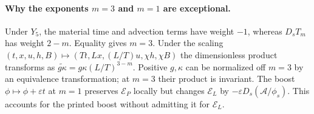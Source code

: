 \documentclass[12pt,a4paper,oneside]{report}
\numberwithin{equation}{chapter}
\theoremstyle{definition}
\theoremstyle{remark}\newtheorem{remark}[theorem]{Remark}
\newif\ifreviewmarks
\DeclareRobustCommand{\review}[1]{{\ifreviewmarks\color{authorblue}\fi #1}}
\begin{document}
\paragraph{Why the exponents $m=3$ and $m=1$ are exceptional.}\label{sec:exceptional}
\review{Under $Y_5$, the material time and advection terms have weight $-1$, whereas $D_sT_m$ has weight $2-m$. Equality gives $m=3$. Under the scaling $(t,x,u,h,B)\mapsto(Tt,Lx,(L/T)u,\chi h,\chi B)$ the dimensionless product transforms as $\widetilde{g\kappa}=g\kappa(L/T)^{3-m}$. Positive $g,\kappa$ can be normalized off $m=3$ by an equivalence transformation; at $m=3$ their product is invariant. The boost $\phi\mapsto\phi+\varepsilon t$ at $m=1$ preserves $\mathcal E_P$ locally but changes $\mathcal E_L$ by $-\varepsilon D_s(\mathcal A/\phi_s)$. This accounts for the printed boost without admitting it for $\mathcal E_L$.}
\end{document}
